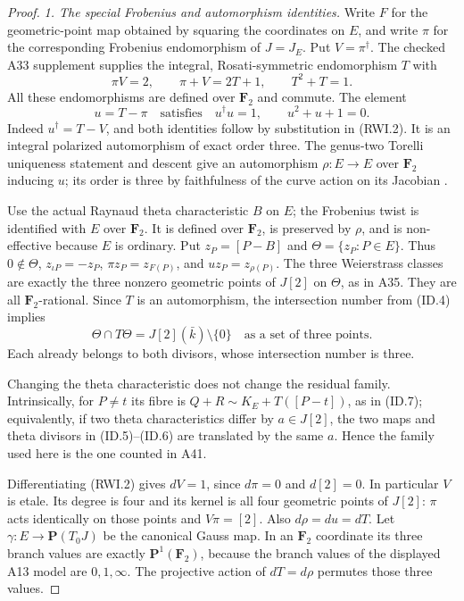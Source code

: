 \begin{proof}
\emph{1. The special Frobenius and automorphism identities.}
Write $F$ for the geometric-point map obtained by squaring
the coordinates on $E$, and write $\pi$ for the corresponding
Frobenius endomorphism of $J=J_E$. Put $V=\pi^\dagger$.
The checked A33 supplement supplies the integral,
Rosati-symmetric endomorphism $T$ with
\[
 \pi V=2,\qquad \pi+V=2T+1,\qquad T^2+T=1.
 \tag{RWI.2}
\]
All these endomorphisms are defined over $\mathbf F_2$ and
commute. The element
\[
 u=T-\pi
 \quad\text{satisfies}\quad
 u^\dagger u=1,\qquad u^2+u+1=0.
 \tag{RWI.3}
\]
Indeed $u^\dagger=T-V$, and both identities follow by
substitution in (RWI.2). It is an integral polarized
automorphism of exact order three. The genus-two Torelli
uniqueness statement and descent give an automorphism
$\rho:E\to E$ over $\mathbf F_2$ inducing $u$; its order
is three by faithfulness of the curve action on its
Jacobian \cite[Theorem~12.1 and Corollary~12.2,
pp.~38--39]{MilneJV}.

Use the actual Raynaud theta characteristic $B$ on $E$;
the Frobenius twist is identified with $E$ over
$\mathbf F_2$. It is defined over $\mathbf F_2$, is preserved
by $\rho$, and is non-effective because $E$ is ordinary.
Put $z_P=[P-B]$ and $\Theta=\{z_P:P\in E\}$.
Thus $0\notin\Theta$, $z_{\iota P}=-z_P$,
$\pi z_P=z_{F(P)}$, and $u z_P=z_{\rho(P)}$.
The three Weierstrass classes are exactly the three
nonzero geometric points of $J[2]$ on $\Theta$, as in A35.
They are all $\mathbf F_2$-rational. Since $T$ is an
automorphism, the intersection number from (ID.4) implies
\[
             \Theta\cap T\Theta
                =J[2](\bar k)\setminus\{0\}
             \quad\text{as a set of three points}.
 \tag{RWI.4}
\]
Each already belongs to both divisors, whose intersection
number is three.

Changing the theta characteristic does not change the
residual family. Intrinsically, for $P\ne t$ its fibre is
$Q+R\sim K_E+T([P-t])$, as in (ID.7); equivalently, if
two theta characteristics differ by $a\in J[2]$, the two
maps and theta divisors in (ID.5)--(ID.6) are translated
by the same $a$. Hence the family used here is the one
counted in A41.

Differentiating (RWI.2) gives $dV=1$, since $d\pi=0$
and $d[2]=0$. In particular $V$ is etale. Its degree is
four and its kernel is all four geometric points of
$J[2]$: $\pi$ acts identically on those points and
$V\pi=[2]$. Also $d\rho=du=dT$.
Let $\gamma:E\to\mathbf P(T_0J)$ be the canonical Gauss
map. In an $\mathbf F_2$ coordinate its three branch
values are exactly $\mathbf P^1(\mathbf F_2)$, because
the branch values of the displayed A13 model are
$0,1,\infty$. The projective action of $dT=d\rho$
permutes those three values.


\end{proof}

